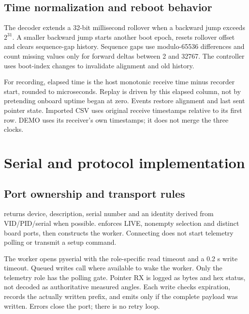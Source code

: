 

\subsection{Time normalization and reboot behavior}
The decoder extends a 32-bit millisecond rollover when a backward jump exceeds
\(2^{31}\). A smaller backward jump starts another boot epoch, resets rollover
offset and clears sequence-gap history. Sequence gaps use modulo-65536
differences and count missing values only for forward deltas between 2 and 32767.
The controller uses boot-index changes to invalidate alignment and old history.

For recording, elapsed time is the host monotonic receive time minus recorder
start, rounded to microseconds. Replay is driven by this elapsed column,
not by pretending onboard uptime began at zero. Events restore alignment and
last sent pointer state. Imported CSV uses original receive timestamps relative
to its first row. DEMO uses its receiver's own timestamps; it does not merge
the three clocks.

\section{Serial and protocol implementation}\label{sec:protocol}
\subsection{Port ownership and transport rules}
 returns device, description, serial number and an identity derived
from VID/PID/serial when possible.  enforces LIVE,
nonempty selection and distinct board ports, then constructs the worker.
Connecting does not start telemetry polling or transmit a setup command.

The worker opens pyserial with the role-specific read timeout and a 0.2 s write
timeout. Queued writes call  where available to wake the worker.
Only the telemetry role has the polling gate. Pointer RX is logged as bytes and
hex status, not decoded as authoritative measured angles.
Each write checks expiration, records the actually written prefix, and emits
 only if the complete payload was written. Errors close the port;
there is no retry loop.

